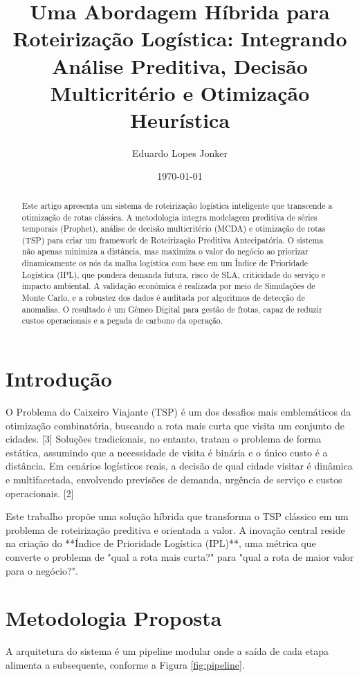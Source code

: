\documentclass[11pt,a4paper,twocolumn]{article}
\title{Uma Abordagem Híbrida para Roteirização Logística: Integrando Análise Preditiva, Decisão Multicritério e Otimização Heurística}
\author{Eduardo Lopes Jonker}
\date{\today}
\begin{document}
\maketitle

\begin{abstract}
Este artigo apresenta um sistema de roteirização logística inteligente que transcende a otimização de rotas clássica. A metodologia integra modelagem preditiva de séries temporais (Prophet), análise de decisão multicritério (MCDA) e otimização de rotas (TSP) para criar um framework de Roteirização Preditiva Antecipatória. O sistema não apenas minimiza a distância, mas maximiza o valor do negócio ao priorizar dinamicamente os nós da malha logística com base em um Índice de Prioridade Logística (IPL), que pondera demanda futura, risco de SLA, criticidade do serviço e impacto ambiental. A validação econômica é realizada por meio de Simulações de Monte Carlo, e a robustez dos dados é auditada por algoritmos de detecção de anomalias. O resultado é um Gêmeo Digital para gestão de frotas, capaz de reduzir custos operacionais e a pegada de carbono da operação.
\end{abstract}

\section{Introdução}

O Problema do Caixeiro Viajante (TSP) é um dos desafios mais emblemáticos da otimização combinatória, buscando a rota mais curta que visita um conjunto de cidades. [3] Soluções tradicionais, no entanto, tratam o problema de forma estática, assumindo que a necessidade de visita é binária e o único custo é a distância. Em cenários logísticos reais, a decisão de qual cidade visitar é dinâmica e multifacetada, envolvendo previsões de demanda, urgência de serviço e custos operacionais. [2]

Este trabalho propõe uma solução híbrida que transforma o TSP clássico em um problema de roteirização preditiva e orientada a valor. A inovação central reside na criação do **Índice de Prioridade Logística (IPL)**, uma métrica que converte o problema de "qual a rota mais curta?" para "qual a rota de maior valor para o negócio?".

\section{Metodologia Proposta}

A arquitetura do sistema é um pipeline modular onde a saída de cada etapa alimenta a subsequente, conforme a Figura \ref{fig:pipeline}.
\end{document}
